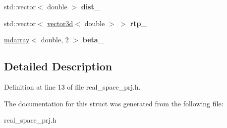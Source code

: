 \begin{DoxyCompactItemize}
\item 
\hypertarget{structsirius_1_1beta__real__space__prj__descriptor_a2a9009d76666a942971c9e992df05429}{}std\+::vector$<$ double $>$ {\bfseries dist\+\_\+}\label{structsirius_1_1beta__real__space__prj__descriptor_a2a9009d76666a942971c9e992df05429}

\item 
\hypertarget{structsirius_1_1beta__real__space__prj__descriptor_a51d1eb90fed8efe9fae7ca54724e7c75}{}std\+::vector$<$ \hyperlink{classgeometry3d_1_1vector3d}{vector3d}$<$ double $>$ $>$ {\bfseries rtp\+\_\+}\label{structsirius_1_1beta__real__space__prj__descriptor_a51d1eb90fed8efe9fae7ca54724e7c75}

\item 
\hypertarget{structsirius_1_1beta__real__space__prj__descriptor_a545bd4b1301b387e75a2161c0d3e82a9}{}\hyperlink{classsddk_1_1mdarray}{mdarray}$<$ double, 2 $>$ {\bfseries beta\+\_\+}\label{structsirius_1_1beta__real__space__prj__descriptor_a545bd4b1301b387e75a2161c0d3e82a9}

\end{DoxyCompactItemize}


\subsection{Detailed Description}


Definition at line 13 of file real\+\_\+space\+\_\+prj.\+h.



The documentation for this struct was generated from the following file\+:\begin{DoxyCompactItemize}
\item 
real\+\_\+space\+\_\+prj.\+h\end{DoxyCompactItemize}

